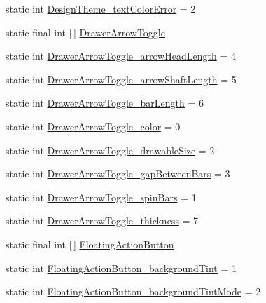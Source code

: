 \begin{DoxyCompactItemize}
\item 
static int \hyperlink{classandroid_1_1support_1_1v7_1_1cardview_1_1R_1_1styleable_a4f7faa1dd10a899663c85c1c21cfe8a2}{Design\+Theme\+\_\+text\+Color\+Error} = 2
\item 
static final int \mbox{[}$\,$\mbox{]} \hyperlink{classandroid_1_1support_1_1v7_1_1cardview_1_1R_1_1styleable_a159ca17c520d2f2d93f6152d01b0b8df}{Drawer\+Arrow\+Toggle}
\item 
static int \hyperlink{classandroid_1_1support_1_1v7_1_1cardview_1_1R_1_1styleable_a8c10e1947477e23e8e39b04ea7b31d6d}{Drawer\+Arrow\+Toggle\+\_\+arrow\+Head\+Length} = 4
\item 
static int \hyperlink{classandroid_1_1support_1_1v7_1_1cardview_1_1R_1_1styleable_aba47177953e487458623d40854700ad5}{Drawer\+Arrow\+Toggle\+\_\+arrow\+Shaft\+Length} = 5
\item 
static int \hyperlink{classandroid_1_1support_1_1v7_1_1cardview_1_1R_1_1styleable_a40a9aac17c990350376902953712f1f3}{Drawer\+Arrow\+Toggle\+\_\+bar\+Length} = 6
\item 
static int \hyperlink{classandroid_1_1support_1_1v7_1_1cardview_1_1R_1_1styleable_ae91140445253d7469509b370ae70f855}{Drawer\+Arrow\+Toggle\+\_\+color} = 0
\item 
static int \hyperlink{classandroid_1_1support_1_1v7_1_1cardview_1_1R_1_1styleable_a6d4ecae9e68c499196ff3d66052769ef}{Drawer\+Arrow\+Toggle\+\_\+drawable\+Size} = 2
\item 
static int \hyperlink{classandroid_1_1support_1_1v7_1_1cardview_1_1R_1_1styleable_afc4238a0fa5fbdfef7ef7f8e7e7a5fd7}{Drawer\+Arrow\+Toggle\+\_\+gap\+Between\+Bars} = 3
\item 
static int \hyperlink{classandroid_1_1support_1_1v7_1_1cardview_1_1R_1_1styleable_adbe4eb7965e87739bfab8deb04a80751}{Drawer\+Arrow\+Toggle\+\_\+spin\+Bars} = 1
\item 
static int \hyperlink{classandroid_1_1support_1_1v7_1_1cardview_1_1R_1_1styleable_a9f8600b105c84f3a4e3054884f09d49e}{Drawer\+Arrow\+Toggle\+\_\+thickness} = 7
\item 
static final int \mbox{[}$\,$\mbox{]} \hyperlink{classandroid_1_1support_1_1v7_1_1cardview_1_1R_1_1styleable_a1be8c9bcabd399162362befcccf73f59}{Floating\+Action\+Button}
\item 
static int \hyperlink{classandroid_1_1support_1_1v7_1_1cardview_1_1R_1_1styleable_ac96a17d99f0790bb52924789602d440b}{Floating\+Action\+Button\+\_\+background\+Tint} = 1
\item 
static int \hyperlink{classandroid_1_1support_1_1v7_1_1cardview_1_1R_1_1styleable_a7823af4317af3e74f9d2ed0b009312aa}{Floating\+Action\+Button\+\_\+background\+Tint\+Mode} = 2

\end{DoxyCompactItemize}
